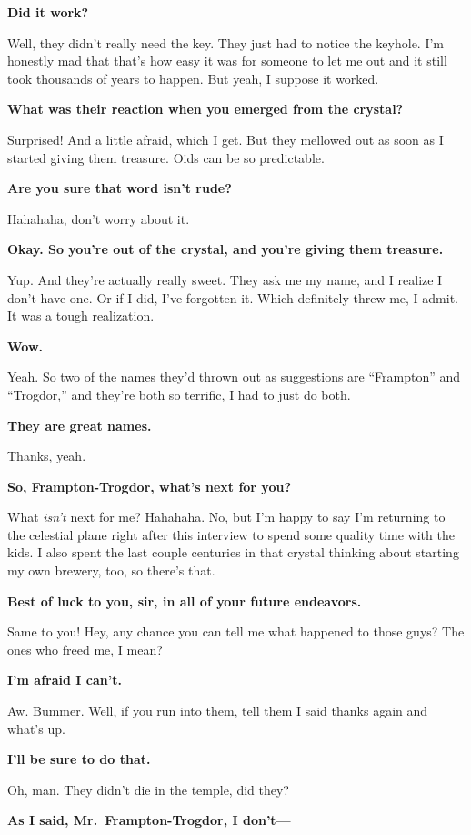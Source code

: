 \documentclass[smalldemyvopaper,11pt,twoside,onecolumn,openright,extrafontsizes]{memoir}
\begin{document}
\textbf{Did it work?}

Well, they didn't really need the key. They just had to notice the
keyhole. I'm honestly mad that that's how easy it was for someone to let
me out and it still took thousands of years to happen. But yeah, I
suppose it worked.

\textbf{What was their reaction when you emerged from the crystal?}

Surprised! And a little afraid, which I get. But they mellowed out as
soon as I started giving them treasure. Oids can be so predictable.

\textbf{Are you sure that word isn't rude?}

Hahahaha, don't worry about it.

\textbf{Okay. So you're out of the crystal, and you're giving them
treasure.}

Yup. And they're actually really sweet. They ask me my name, and I
realize I don't have one. Or if I did, I've forgotten it. Which
definitely threw me, I admit. It was a tough realization.

\textbf{Wow.}

Yeah. So two of the names they'd thrown out as suggestions are
``Frampton'' and ``Trogdor,'' and they're both so terrific, I had to
just do both.

\textbf{They are great names.}

Thanks, yeah.

\textbf{So, Frampton-Trogdor, what's next for you?}

What \emph{isn't} next for me? Hahahaha. No, but I'm happy to say I'm
returning to the celestial plane right after this interview to spend
some quality time with the kids. I also spent the last couple centuries
in that crystal thinking about starting my own brewery, too, so there's
that.

\textbf{Best of luck to you, sir, in all of your future endeavors.}

Same to you! Hey, any chance you can tell me what happened to those
guys? The ones who freed me, I mean?

\textbf{I'm afraid I can't.}

Aw. Bummer. Well, if you run into them, tell them I said thanks again
and what's up.

\textbf{I'll be sure to do that.}

Oh, man. They didn't die in the temple, did they?

\textbf{As I said, Mr.~Frampton-Trogdor, I don't---}
\end{document}
